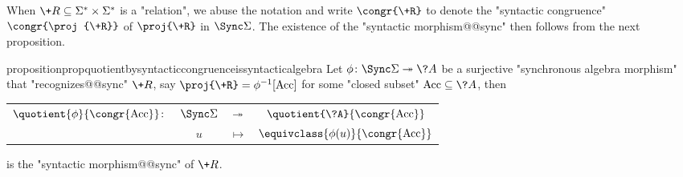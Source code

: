 When $\+R \subseteq \Sigma^* \times\Sigma^*$ is a "relation", we abuse
the notation and write $\congr{\+R}$ to denote
the "syntactic congruence" $\congr{\proj{\+R}}$ of $\proj{\+R}$
in $\Sync\Sigma$.
The existence of the "syntactic morphism@@sync" then follows from
the next proposition.

\begin{restatable}{proposition}{propquotientbysyntacticcongruenceissyntacticalgebra}
	\AP\label{prop:quotient-by-syntactic-congruence-is-syntactic-algebra}
	Let $\phi\colon \Sync\Sigma \surj \?A$ be a surjective "synchronous algebra morphism"
	that "recognizes@@sync" $\+R$, say $\proj{\+R} = \phi^{-1}[\Acc]$
	for some "closed subset" $\Acc \subseteq \?A$, then 
	\begin{center}
		\begin{tabular}{rccc}
			$\quotient{\phi}{\congr{\Acc}}\colon$
			& $\Sync\Sigma$
			& $\twoheadrightarrow$
			& $\quotient{\?A}{\congr{\Acc}}$\\
			& $u$
			& $\mapsto$
			& $\equivclass{\phi(u)}{\congr{\Acc}}$
		\end{tabular}		
	\end{center}
	is the "syntactic morphism@@sync" of $\+R$.
\end{restatable}

